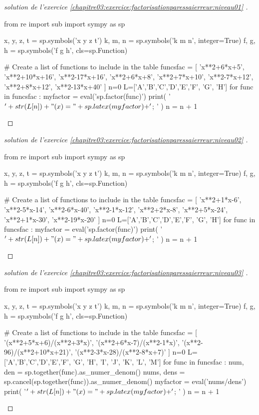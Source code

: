 \vfill 
\begin{proof}[solution de l'exercice \ref{chapitre03:exercice:factorisationparessaierreur:niveau01} ]  \hfill
	
\begin{pycode}
from re import sub
import sympy as sp

x, y, z, t = sp.symbols('x y z t')
k, m, n = sp.symbols('k m n', integer=True)
f, g, h = sp.symbols('f g h', cls=sp.Function)

# Create a list of functions to include in the table
funcsfac = [ 
'x**2+6*x+5',
'x**2+10*x+16',
'x**2-17*x+16',
'x**2+6*x+8',
'x**2+7*x+10', 
'x**2-7*x+12', 
'x**2+8*x+12', 
'x**2-13*x+40'
]
n=0
L=['A','B','C','D','E','F', 'G', 'H']
for func in funcsfac :  
	myfactor =  eval('sp.factor(func)')
	print( '$'+ str(L[n])  + "(x)=" + sp.latex(myfactor) + '$; ' ) 
	n     = n + 1
\end{pycode}
\end{proof}
\begin{proof}[solution de l'exercice \ref{chapitre03:exercice:factorisationparessaierreur:niveau02} ]  \hfill
	
\begin{pycode}
from re import sub
import sympy as sp

x, y, z, t = sp.symbols('x y z t')
k, m, n = sp.symbols('k m n', integer=True)
f, g, h = sp.symbols('f g h', cls=sp.Function)

# Create a list of functions to include in the table
funcsfac = [ 
'x**2+1*x-6',
'x**2-5*x-14',
'x**2-6*x-40',
'x**2-1*x-12',
'x**2+2*x-8', 
'x**2+5*x-24', 
'x**2+1*x-30', 
'x**2-19*x-20'
]
n=0
L=['A','B','C','D','E','F', 'G', 'H']
for func in funcsfac :  
	myfactor =  eval('sp.factor(func)')
	print( '$'+ str(L[n])  + "(x)=" + sp.latex(myfactor) + '$; ' ) 
	n     = n + 1
\end{pycode}
	\end{proof}
\begin{proof}[solution de l'exercice \ref{chapitre03:exercice:factorisationparessaierreur:niveau03} ]  \hfill
	
\begin{pycode}
from re import sub
import sympy as sp

x, y, z, t = sp.symbols('x y z t')
k, m, n = sp.symbols('k m n', integer=True)
f, g, h = sp.symbols('f g h', cls=sp.Function)

# Create a list of functions to include in the table
funcsfac = [  
'(x**2+5*x+6)/(x**2+3*x)', 
'(x**2+6*x-7)/(x**2-1*x)', 
'(x**2-96)/(x**2+10*x+21)', 
'(x**2-3*x-28)/(x**2-8*x+7)'
]
n=0
L=['A','B','C','D','E','F', 'G', 'H', 'I', 'J', 'K', 'L', 'M']
for func in funcsfac :  
	num, den = sp.together(func).as_numer_denom()
	nums, dens = sp.cancel(sp.together(func)).as_numer_denom()
	myfactor =  eval('nums/dens')
	print( '$'+ str(L[n])  + "(x)=" + sp.latex(myfactor) + '$; ' ) 
	n     = n + 1
\end{pycode} 
\end{proof}
